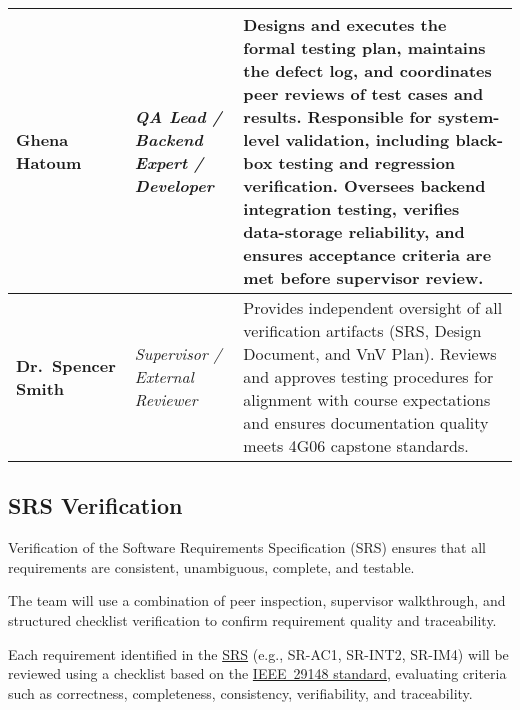 \documentclass[12pt, titlepage]{article}
\begin{document}
\begin{center}
\begin{longtable}{|>{\raggedright\arraybackslash}p{}|
                    >{\raggedright\arraybackslash}p{}|
                    >{\raggedright\arraybackslash}p{}|}
\textbf{Ghena Hatoum} &
\textit{QA Lead / Backend Expert / Developer} &
Designs and executes the formal testing plan, maintains the defect log, and coordinates peer reviews of test cases and results. Responsible for system-level validation, including black-box testing and regression verification. Oversees backend integration testing, verifies data-storage reliability, and ensures acceptance criteria are met before supervisor review. \\
\hline

\textbf{Dr.\ Spencer Smith} &
\textit{Supervisor / External Reviewer} &
Provides independent oversight of all verification artifacts (SRS, Design Document, and VnV Plan). Reviews and approves testing procedures for alignment with course expectations and ensures documentation quality meets 4G06 capstone standards. \\
\end{longtable}
\end{center}



\subsection{SRS Verification}
\label{subsec:srs-verification}


Verification of the Software Requirements Specification (SRS) ensures that all
requirements are consistent, unambiguous, complete, and testable.

The team will use a combination of peer inspection, supervisor walkthrough, and
structured checklist verification to confirm requirement quality and
traceability.

Each requirement identified in the \href{https://github.com/thaafei/DomainX/blob/main/docs/SRS/SRS.pdf}{SRS} (e.g., SR-AC1, SR-INT2, SR-IM4) will be
reviewed using a checklist based on the \href{https://standards.ieee.org/ieee/29148/6937/}{IEEE~29148 standard}, evaluating criteria
such as correctness, completeness, consistency, verifiability, and
traceability.
\end{document}
